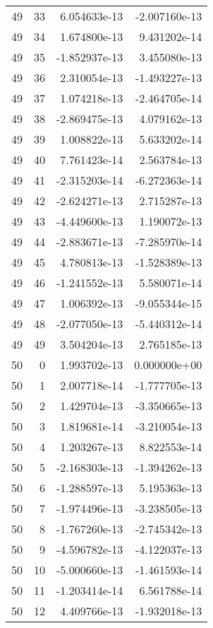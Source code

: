 \begin{tabular}{rrrr}
  49 &   33 &  6.054633e-13 & -2.007160e-13 \\
  49 &   34 &  1.674800e-13 &  9.431202e-14 \\
  49 &   35 & -1.852937e-13 &  3.455080e-13 \\
  49 &   36 &  2.310054e-13 & -1.493227e-13 \\
  49 &   37 &  1.074218e-13 & -2.464705e-14 \\
  49 &   38 & -2.869475e-13 &  4.079162e-13 \\
  49 &   39 &  1.008822e-13 &  5.633202e-14 \\
  49 &   40 &  7.761423e-14 &  2.563784e-13 \\
  49 &   41 & -2.315203e-14 & -6.272363e-14 \\
  49 &   42 & -2.624271e-13 &  2.715287e-13 \\
  49 &   43 & -4.449600e-13 &  1.190072e-13 \\
  49 &   44 & -2.883671e-13 & -7.285970e-14 \\
  49 &   45 &  4.780813e-13 & -1.528389e-13 \\
  49 &   46 & -1.241552e-13 &  5.580071e-14 \\
  49 &   47 &  1.006392e-13 & -9.055344e-15 \\
  49 &   48 & -2.077050e-13 & -5.440312e-14 \\
  49 &   49 &  3.504204e-13 &  2.765185e-13 \\
  50 &    0 &  1.993702e-13 &  0.000000e+00 \\
  50 &    1 &  2.007718e-14 & -1.777705e-13 \\
  50 &    2 &  1.429704e-13 & -3.350665e-13 \\
  50 &    3 &  1.819681e-14 & -3.210054e-13 \\
  50 &    4 &  1.203267e-13 &  8.822553e-14 \\
  50 &    5 & -2.168303e-13 & -1.394262e-13 \\
  50 &    6 & -1.288597e-13 &  5.195363e-13 \\
  50 &    7 & -1.974496e-13 & -3.238505e-13 \\
  50 &    8 & -1.767260e-13 & -2.745342e-13 \\
  50 &    9 & -4.596782e-13 & -4.122037e-13 \\
  50 &   10 & -5.000660e-13 & -1.461593e-14 \\
  50 &   11 & -1.203414e-14 &  6.561788e-14 \\
  50 &   12 &  4.409766e-13 & -1.932018e-13 \\

\end{tabular}
